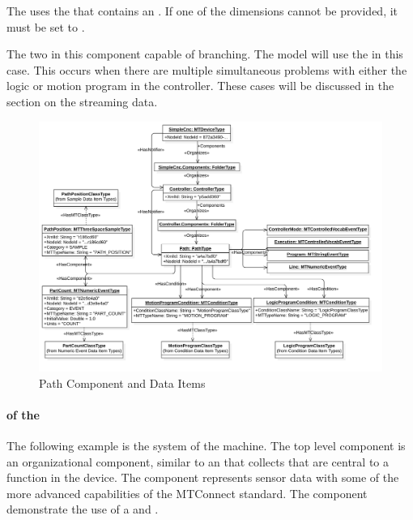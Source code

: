 The  uses the  that contains an  . If one of the dimensions cannot be provided, it must be set to .

The two  in this component capable of branching. The model will use the  in this case. This occurs when there are multiple simultaneous problems with either the logic or motion program in the controller. These cases will be discussed in the section on the streaming data.

\begin{figure}[ht]
  \centering
  \includegraphics[width=1.0\textwidth]{diagrams/mtconnect-mapping/path-component.png}
  \caption{Path Component and Data Items}
  \label{fig:path-component}
\end{figure}

\FloatBarrier

\paragraph{  of the }

The following example is the  system of the machine. The top level  component is an organizational component, similar to an  that collects  that are central to a function in the device. The  component represents sensor data with some of the more advanced capabilities of the MTConnect standard. The  component demonstrate the use of a  and .

